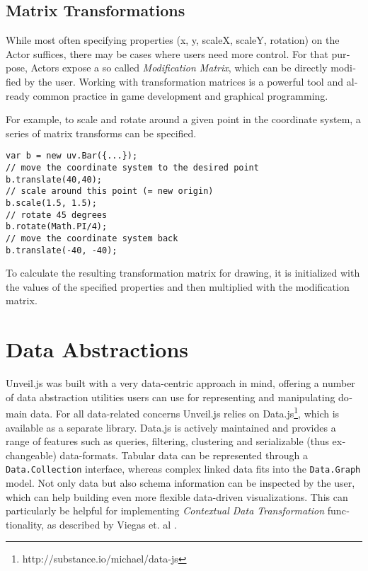 \begin{english}
\subsection{Matrix Transformations}

While most often specifying properties (x, y, scaleX, scaleY, rotation) on the Actor suffices, there may be cases where users need more control. For that purpose, Actors expose a so called \emph{Modification Matrix}, which can be directly modified by the user. Working with transformation matrices is a powerful tool and already common practice in game development and graphical programming.

\SuperPar For example, to scale and rotate around a given point in the coordinate system, a series of matrix transforms can be specified.

\begin{verbatim}
var b = new uv.Bar({...});
// move the coordinate system to the desired point
b.translate(40,40);
// scale around this point (= new origin)
b.scale(1.5, 1.5);
// rotate 45 degrees
b.rotate(Math.PI/4);
// move the coordinate system back
b.translate(-40, -40);
\end{verbatim}

\SuperPar To calculate the resulting transformation matrix for drawing, it is initialized with the values of the specified properties and then multiplied with
the modification matrix.

\section{Data Abstractions}
\label{cha:dataabstractions}

Unveil.js was built with a very data-centric approach in mind, offering a number of data abstraction utilities users can use for representing and manipulating domain data. For all data-related concerns Unveil.js relies on Data.js\footnote{http://substance.io/michael/data-js}, which is available as a separate library. Data.js is actively maintained and provides a range of features such as queries, filtering, clustering and serializable (thus exchangeable) data-formats. Tabular data can be represented through a \texttt{Data.Collection} interface, whereas complex linked data fits into the \texttt{Data.Graph} model. Not only data but also schema information can be inspected by the user, which can help building even more flexible data-driven visualizations. This can particularly be helpful for implementing \emph{Contextual Data Transformation} functionality, as described by Viegas et. al \cite{manyeyes}.


\end{english}
